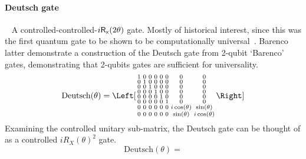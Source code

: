 \documentclass[article,pagebackref]{bespoke5}
\newcommand{\Gate}[1]{\ensuremath{{\sf{#1}}}}
\begin{document}
\paragraph{Deutsch gate}~\cite{Deutsch1989a, Barenco1995a, Shi2018a}
A controlled-controlled-$i\Gate{R_x}(2\theta)$ gate. Mostly of historical interest, since this was the first quantum gate to be shown to be computationally universal~\cite{Deutsch1989a}. Barenco~\cite{ Barenco1995a} latter demonstrate a construction of the Deutsch gate from 2-qubit `Barenco' gates, demonstrating that 2-qubits gates are sufficient for universality. 
\[
\text{Deutsch}(\theta) =
\Left[ \begin{smallmatrix}
                1& 0& 0& 0& 0& 0& 0& 0 \\
                0& 1& 0& 0& 0& 0& 0& 0 \\
                0& 0& 1& 0& 0& 0& 0& 0 \\
                0& 0& 0& 1& 0& 0& 0& 0 \\
                0& 0& 0& 0& 1& 0& 0& 0 \\
                0& 0& 0& 0& 0& 1& 0& 0 \\
                0& 0& 0& 0& 0& 0& i \cos(\theta) & \sin(\theta) \\
                0& 0& 0& 0& 0& 0& \sin(\theta)& i \cos(\theta)
\end{smallmatrix} \Right]
\]
Examining the controlled unitary sub-matrix, the Deutsch gate can be thought of as a controlled $i R_X(\theta)^2$ gate.
$$
\text{Deutsch}(\theta) = 

$$


% 
% 







%
%
%


\end{document}
